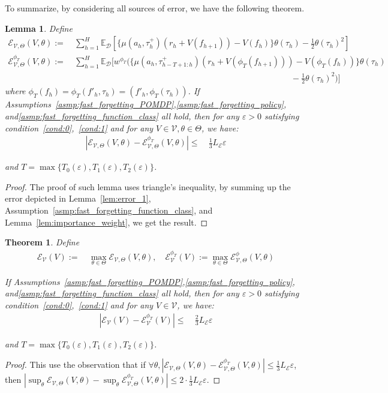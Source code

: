 \documentclass[twoside]{article}
\newtheorem{theorem}{Theorem}
\newtheorem{lemma}{Lemma}
\newcommand{\CAL}[1]{\mathcal{#1}}
\begin{document}
To summarize, by considering all sources of error, we have the following theorem.
\begin{lemma}\label{lemma:11_fdvf}
    Define
\begin{align}
    \CAL{E}_{\CAL{V},\Theta}(V,\theta):=&\ \sum_{h=1}^H\mathbb{E}_{\CAL{D}}[\{\mu(a_h,\tau_h^+)(r_h+V(f_{h+1}))- V(f_h)\}\theta(\tau_h)-\frac{1}{2}\theta(\tau_h)^2]\\
        \CAL{E}^{\phi_T}_{\CAL{V},\Theta}(V,\theta):=&\ \sum_{h=1}^H\mathbb{E}_{\CAL{D}}[w^{\phi_T}(\{\mu(a_h,\tau_{h-T+1:h}^+)(r_h+V(\phi_T(f_{h+1})))-V(\phi_T(f_h))\}\theta(\tau_h)\nonumber\\&\qquad\qquad\qquad\qquad\qquad\qquad\qquad\qquad\qquad\qquad\qquad\qquad\qquad-\frac{1}{2}\theta(\tau_h)^2)]
\end{align}
where $\phi_T(f_{h})=\phi_T(f'_h,\tau_h)=(f'_h,\phi_T(\tau_h))$.
If Assumptions~\ref{asmp:fast_forgetting_POMDP},\ref{asmp:fast_forgetting_policy}, and\ref{asmp:fast_forgetting_function_class} all hold, then for any $\varepsilon > 0$ satisfying condition~\ref{cond:0},~\ref{cond:1} and for any $V \in \CAL{V},\theta\in\Theta$, we have:
\begin{align}
|\CAL{E}_{\CAL{V},\Theta}(V,\theta)-\CAL{E}^{\phi_T}_{\CAL{V},\Theta}(V,\theta)|\leq&\ \frac{1}{3}L_{\CAL{E}}\varepsilon
\end{align}

and $T=\max\{T_0(\varepsilon),T_1(\varepsilon),T_2(\varepsilon)\}$.
\end{lemma}
\begin{proof}
    The proof of such lemma uses triangle's inequality, by summing up the error depicted in Lemma~\ref{lem:error_1}, Assumption~\ref{asmp:fast_forgetting_function_class}, and Lemma~\ref{lem:importance_weight}, we get the result.
\end{proof}
\begin{theorem}\label{Thm:5-20}
Define
\begin{align}
    \CAL{E}_{\CAL{V}}(V):=&\ \max_{\theta \in \Theta}\CAL{E}_{\CAL{V},\Theta}(V,\theta),\quad
        \CAL{E}^{\phi_T}_{\CAL{V}}(V):=\max_{\theta \in \Theta}\CAL{E}_{\CAL{V},\Theta}^\phi(V,\theta)
\end{align}

If Assumptions~\ref{asmp:fast_forgetting_POMDP},\ref{asmp:fast_forgetting_policy}, and\ref{asmp:fast_forgetting_function_class} all hold, then for any $\varepsilon > 0$ satisfying condition~\ref{cond:0},~\ref{cond:1} and for any $V \in \CAL{V}$, we have:
\begin{align}
|\CAL{E}_{\CAL{V}}(V)-\CAL{E}^{\phi_T}_{\CAL{V}}(V)|\leq&\ \frac{2}{3}L_{\CAL{E}}\varepsilon
\end{align}

and $T=\max\{T_0(\varepsilon),T_1(\varepsilon),T_2(\varepsilon)\}$.
\end{theorem}
\begin{proof}
    This use the observation that if $\forall\theta, |\CAL{E}_{\CAL{V},\Theta}(V,\theta)-\CAL{E}_{\CAL{V},\Theta}^{\phi_T}(V,\theta)|\leq \frac{1}{3}L_\CAL{E}\varepsilon$, then $|\sup_{\theta}\CAL{E}_{\CAL{V},\Theta}(V,\theta)-\sup_{\theta}\CAL{E}_{\CAL{V},\Theta}^{\phi_T}(V,\theta)|\leq 2\cdot\frac{1}{3}L_\CAL{E}\varepsilon$.
\end{proof}
\end{document}

